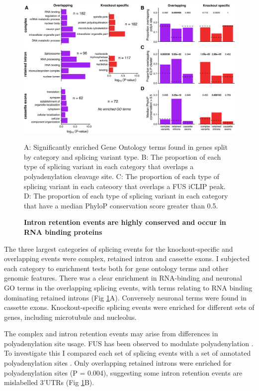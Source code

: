 \begin{figure}[t]
	\centering
	\includegraphics[width=\textwidth]{Figures/06_fus_meta/splicing_go_functions.png}
	\caption{\textbf{Intron retention events are highly conserved and occur in RNA binding proteins} }	
	A: Significantly enriched Gene Ontology terms found in genes split by category and splicing variant type.
	B: The proportion of each type of splicing variant in each category that overlaps a polyadenylation cleavage site.
	C: The proportion of each type of splicing variant in each cateoory that overlaps a FUS iCLIP peak.
	D: The proportion of each type of splicing variant in each category that have a median PhyloP conservation score greater than 0.5.
	\label{fig:fus_splicing_functions}
\end{figure}

The three largest categories of splicing events for the knockout-specific and overlapping events were complex, retained intron and cassette exons. 
I subjected each category to enrichment tests both for gene ontology terms and other genomic features.
There was a clear enrichment in RNA-binding and neuronal GO terms in the overlapping splicing events, with terms relating to RNA binding dominating retained introns (Fig \ref{fig:fus_splicing_functions}A). 
Conversely neuronal terms were found in cassette exons. 
Knockout-specific splicing events were enriched for different sets of genes, including microtubule and nucleolus.

The complex and intron retention events may arise from differences in polyadenylation site usage.
FUS has been observed to modulate polyadenylation \citep{Masuda2015}.
To investigate this I compared each set of splicing events with a set of annotated polyadenylation sites \citep{Gruber2016}.
Only overlapping retained introns were enriched for polyadenylation sites (P = 0.004), suggesting some intron retention events are mislabelled 3'UTRs (Fig \ref{fig:fus_splicing_functions}B).

